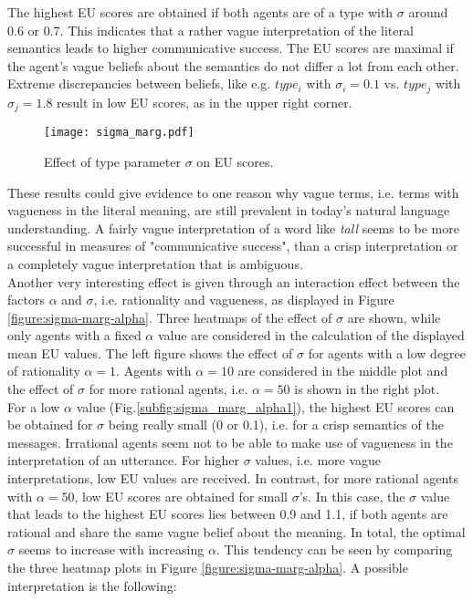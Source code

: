 The highest EU scores are obtained if both agents are of a type with $\sigma$ around 0.6 or 0.7. This indicates that a rather vague interpretation of the literal semantics leads to higher communicative success. The EU scores are maximal if the agent's vague beliefs about the semantics do not differ a lot from each other. Extreme discrepancies between beliefs, like e.g. $type_i$ with $\sigma_i = 0.1$ vs. $type_j$ with $\sigma_j = 1.8$ result in low EU scores, as in the upper right corner.
\begin{figure}[h]
 \centering
 \texttt{[image: sigma\_marg.pdf]}
 \caption{Effect of type parameter $\sigma$ on EU scores.}
 \label{figure:sigma_marg}
\end{figure}
These results could give evidence to one reason why vague terms, i.e. terms with vagueness in the literal meaning, are still prevalent in today's natural language understanding. A fairly vague interpretation of a word like \textit{tall} seems to be more successful in measures of "communicative success", than a crisp interpretation or a completely vague interpretation that is ambiguous.\\

Another very interesting effect is given through an interaction effect between the factors $\alpha$ and $\sigma$, i.e. rationality and vagueness, as displayed in Figure \ref{figure:sigma-marg-alpha}.
Three heatmaps of the effect of $\sigma$ are shown, while only agents with a fixed $\alpha$ value are considered in the calculation of the displayed mean EU values. The left figure shows the effect of $\sigma$ for agents with a low degree of rationality $\alpha = 1$. Agents with $\alpha = 10$ are considered in the middle plot and the effect of $\sigma$ for more rational agents, i.e. $\alpha = 50$ is shown in the right plot.\\

For a low $\alpha$ value (Fig.\ref{subfig:sigma_marg_alpha1}), the highest EU scores can be obtained for $\sigma$ being really small (0 or 0.1), i.e. for a crisp semantics of the messages.  Irrational agents seem not to be able to make use of vagueness in the interpretation of an utterance. For higher $\sigma$ values, i.e. more vague interpretations, low EU values are received.
In contrast, for more rational agents with $\alpha=50$, low EU scores are obtained for small $\sigma$'s. In this case, the $\sigma$ value that leads to the highest EU scores lies between 0.9 and 1.1, if both agents are rational and share the same vague belief about the meaning. In total, the optimal $\sigma$ seems to increase with increasing $\alpha$. This tendency can be seen by comparing the three heatmap plots in Figure \ref{figure:sigma-marg-alpha}.
A possible interpretation is the following:\\

